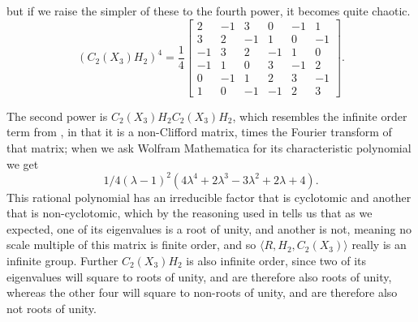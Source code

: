 but if we raise the simpler of these to the fourth power, it becomes quite chaotic.
\[\left(C_2(X_3)H_2\right)^4 =
\frac{1}{4}
\begin{bmatrix}
	2&-1&3&0&-1&1\\ 
	3&2&-1&1&0&-1\\ 
	-1&3&2&-1&1&0\\ 
	-1&1&0&3&-1&2\\ 
	0&-1&1&2&3&-1\\ 
	1&0&-1&-1&2&3
\end{bmatrix}.
\]

The second power is $C_2(X_3)H_2C_2(X_3)H_2$, which resembles the infinite order term from \cite{universal-qubit}, in that it is a non-Clifford matrix, times the Fourier transform of that matrix; when we ask Wolfram Mathematica for its characteristic polynomial we get
\[1/4 (\lambda - 1)^2 (4 \lambda^4 + 2 \lambda^3 - 3 \lambda^2 + 2 \lambda + 4).\]
This rational polynomial has an irreducible factor that is cyclotomic and another that is non-cyclotomic, which by the reasoning used in \cite{universal-qubit} tells us that as we expected, one of its eigenvalues is a root of unity, and another is not, meaning no scale multiple of this matrix is finite order, and so $\langle R, H_2, C_2(X_3) \rangle$ really is an infinite group. Further $C_2(X_3)H_2$ is also infinite order, since two of its eigenvalues will square to roots of unity, and are therefore also roots of unity, whereas the other four will square to non-roots of unity, and are therefore also not roots of unity.

